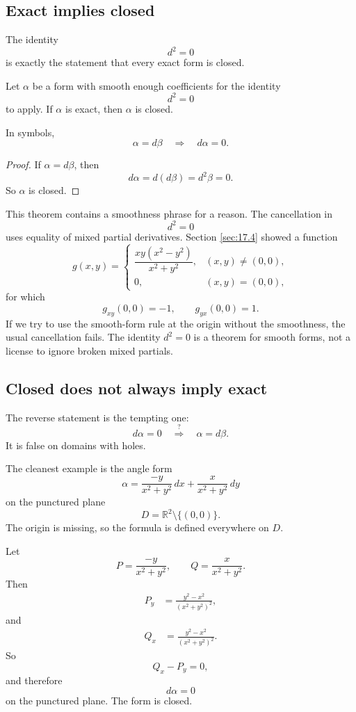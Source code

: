 \subsection{Exact implies closed}

The identity
\[
    d^2=0
\]
is exactly the statement that every exact form is closed.

\begin{theorem}
Let \(\alpha\) be a form with smooth enough coefficients for the identity
\[
    d^2=0
\]
to apply.  If \(\alpha\) is exact, then \(\alpha\) is closed.

In symbols,
\[
\boxed{
    \alpha=d\beta
    \quad\Longrightarrow\quad
    d\alpha=0.
}
\]
\end{theorem}

\begin{proof}
If \(\alpha=d\beta\), then
\[
    d\alpha=d(d\beta)=d^2\beta=0.
\]
So \(\alpha\) is closed.
\end{proof}

This theorem contains a smoothness phrase for a reason.  The cancellation in
\[
    d^2=0
\]
uses equality of mixed partial derivatives.  Section \ref{sec:17.4} showed a function
\[
    g(x,y)=
    \begin{cases}
    \dfrac{xy(x^2-y^2)}{x^2+y^2}, & (x,y)\ne(0,0),\\[2mm]
    0, & (x,y)=(0,0),
    \end{cases}
\]
for which
\[
    g_{xy}(0,0)=-1,
    \qquad
    g_{yx}(0,0)=1.
\]
If we try to use the smooth-form rule at the origin without the smoothness, the usual
cancellation fails.  The identity \(d^2=0\) is a theorem for smooth forms, not a license
to ignore broken mixed partials.

\subsection{Closed does not always imply exact}

The reverse statement is the tempting one:
\[
    d\alpha=0
    \quad\stackrel{?}{\Longrightarrow}\quad
    \alpha=d\beta.
\]
It is false on domains with holes.

The cleanest example is the angle form
\[
    \alpha=
    \frac{-y}{x^2+y^2}\,dx+
    \frac{x}{x^2+y^2}\,dy
\]
on the punctured plane
\[
    D=\mathbb R^2\setminus\{(0,0)\}.
\]
The origin is missing, so the formula is defined everywhere on \(D\).

Let
\[
    P=\frac{-y}{x^2+y^2},
    \qquad
    Q=\frac{x}{x^2+y^2}.
\]
Then
\[
\begin{aligned}
P_y
&=
\frac{y^2-x^2}{(x^2+y^2)^2},
\end{aligned}
\]
and
\[
\begin{aligned}
Q_x
&=
\frac{y^2-x^2}{(x^2+y^2)^2}.
\end{aligned}
\]
So
\[
    Q_x-P_y=0,
\]
and therefore
\[
\boxed{
    d\alpha=0
}
\]
on the punctured plane.  The form is closed.

